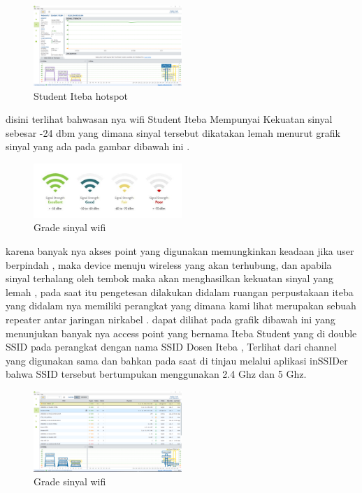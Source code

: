 \documentclass[conference]{IEEEtran}
\begin{document}
\begin{figure}[h]
    \centering
    \includegraphics[width=0.5\textwidth]{2.png}
    \caption{Student Iteba hotspot}
\end{figure}

disini terlihat bahwasan nya wifi Student Iteba Mempunyai Kekuatan sinyal sebesar -24 dbm yang dimana sinyal tersebut dikatakan lemah menurut
grafik sinyal yang ada pada gambar dibawah ini .

\begin{figure}[h]
    \centering
    \includegraphics[width=0.5\textwidth]{3.jpg}
    \caption{Grade sinyal wifi}
\end{figure}

karena banyak nya akses point yang digunakan memungkinkan keadaan jika user berpindah , maka device menuju wireless yang akan terhubung,
dan apabila sinyal terhalang oleh tembok maka akan menghasilkan kekuatan sinyal yang lemah , pada saat itu pengetesan dilakukan didalam ruangan
perpustakaan iteba yang didalam nya memiliki perangkat yang dimana kami lihat merupakan sebuah repeater antar jaringan nirkabel .
dapat dilihat pada grafik dibawah ini yang menunjukan banyak nya access point yang bernama Iteba Student yang di double SSID pada perangkat dengan nama SSID
Dosen Iteba , Terlihat dari channel yang digunakan sama dan bahkan pada saat di tinjau melalui aplikasi inSSIDer bahwa SSID tersebut bertumpukan menggunakan 2.4 Ghz dan 5 Ghz.~\cite{arnomoanalisis}

\begin{figure}[h]
    \centering
    \includegraphics[width=0.5\textwidth]{4.png}
    \caption{Grade sinyal wifi}
\end{figure}
\end{document}
